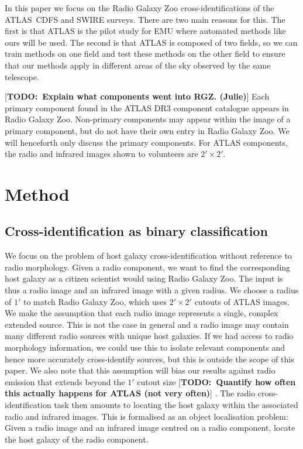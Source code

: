 \documentclass[fleqn,usenatbib,usedcolumn]{mnras}
\newcommand{\todo}[1]{ {\color{red}[{\bf TODO:~{#1}}]} }
\begin{document}
    In this paper we focus on the Radio Galaxy Zoo cross-identifications of
    the ATLAS~CDFS and SWIRE surveys. There are two main reasons for this. The
    first is that ATLAS is the pilot study for EMU where automated methods
    like ours will be used. The second is that ATLAS is composed of two
    fields, so we can train methods on one field and test these methods on
    the other field to ensure that our methods apply in different areas of
    the sky observed by the same telescope.

    \todo{Explain what components went into RGZ. (Julie)} Each primary component
    found in the ATLAS DR3 component catalogue appears in Radio Galaxy Zoo.
    Non-primary components may appear within the image of a primary component,
    but do not have their own entry in Radio Galaxy Zoo. We will henceforth only
    discuss the primary components. For ATLAS components, the radio and infrared
    images shown to volunteers are \(2' \times 2'\).

  \section{Method}\label{method}

  \subsection{Cross-identification as binary
  classification}\label{cross-identification-as-binary-classification}

    We focus on the problem of host galaxy cross-identification without
    reference to radio morphology. Given a radio component, we want to find the
    corresponding host galaxy as a citizen scientist would using Radio Galaxy
    Zoo. The input is thus a radio image and an infrared image with a given
    radius. We choose a radius of $1'$ to match Radio Galaxy Zoo, which uses $2'
    \times 2'$ cutouts of ATLAS images. We make the assumption that each radio
    image represents a single, complex extended source. This is not the case in
    general and a radio image may contain many different radio sources with
    unique host galaxies. If we had access to radio morphology information, we
    could use this to isolate relevant components and hence more accurately
    cross-identify sources, but this is outside the scope of this paper. We also
    note that this assumption will bias our results against radio emission that
    extends beyond the $1'$ cutout size \todo{Quantify how often this actually
    happens for ATLAS (not very often)}. The radio cross-identification task
    then amounts to locating the host galaxy within the associated radio and
    infrared images. This is formalised as an object localisation problem: Given
    a radio image and an infrared image centred on a radio component, locate the
    host galaxy of the radio component.
\end{document}
